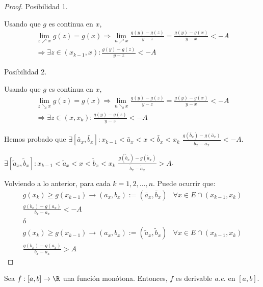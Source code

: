 \begin{proof}
Posibilidad 1.

Usando que $g$ es continua en $x$,
\begin{align*}
    \label{}
    \lim_{z \nearrow x} g(z) = g(x) \Rightarrow \lim_{n \nearrow x} \frac{g(y) - g(z)}{y-z} = \frac{g(y)-g(x)}{y-x} < - A \\
    \Rightarrow \exists z \in (x_{k-1}, x) : \frac{g(y) - g(z)}{y-z} < -A
\end{align*}

Posibilidad 2.

Usando que $g$ es continua en $x$,
\begin{align*}
    \label{}
    \lim_{z \searrow x} g(z) = g(x) \Rightarrow \lim_{n \searrow x} \frac{g(y) - g(z)}{y-z} = \frac{g(y)-g(x)}{y-x} < - A \\
    \Rightarrow \exists z \in (x, x_{k}) : \frac{g(y) - g(z)}{y-z} < -A
\end{align*}

Hemos probado que $\exists [\bar{a}_x, \bar{b}_x] : x_{k-1} < \bar{a}_x < x < \bar{b}_x < x_k$ $\frac{g(\bar{b}_x)- g(\bar{a}_x)}{\bar{b}_x - \bar{a}_x} < - A$.

$\exists [\tilde{a}_x, \tilde{b}_x] : x_{k-1} < \tilde{a}_x < x < \tilde{b}_x < x_k$ $\frac{g(\tilde{b}_x)- g(\tilde{a}_x)}{\tilde{b}_x - \tilde{a}_x} > A$.


Volviendo a lo anterior, para cada $k = 1, 2, \hdots, n$. Puede ocurrir que:
\begin{align*}
    \label{e}
    g(x_k) \geq g(x_{k-1}) \rightarrow (a_x, b_x) := (\bar{a}_x, \bar{b}_x) &\forall x \in E \cap (x_{k-1}, x_k) \\
    \frac{g(b_x) - g(a_x)}{b_x - a_x} < -A \\
    ó \\
    g(x_k) \geq g(x_{k-1}) \rightarrow (a_x, b_x) := (\tilde{a}_x, \tilde{b}_x) &\forall x \in E \cap (x_{k-1}, x_k) \\
    \frac{g(b_x) - g(a_x)}{b_x - a_x} > A
\end{align*}


\end{proof}

\begin{nth}
    Sea $f : [a, b] \rightarrow \R$ una función monótona. Entonces, $f$ es derivable \textit{a.e.} en $[a, b]$.
\end{nth}

